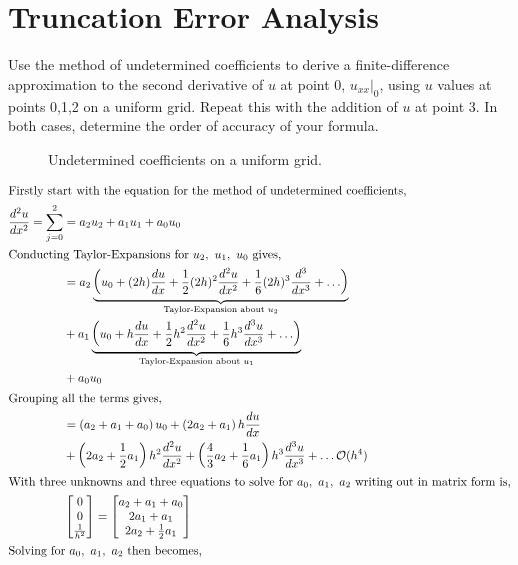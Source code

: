\pagebreak
\section{Truncation Error Analysis}
Use the method of undetermined coefficients to derive a finite-difference approximation to the second derivative of $u$ at point 0, $u_{xx}|_0$, using $u$ values at points 0,1,2 on a uniform grid.  Repeat this with the addition of $u$ at point 3.  In both cases, determine the order of accuracy of your formula.

    \begin{figure}[h]
        \centering
        
        \caption{Undetermined coefficients on a uniform grid.}
    \end{figure}

\vspace{-0.2in}
\begin{align*}
    \shortintertext{Firstly start with the equation for the method of undetermined coefficients,}
    \frac{d^2u}{dx^2} = \sum_{j=0}^{2} & = a_2u_2 + a_1u_1 + a_0u_0\\
    \shortintertext{Conducting Taylor-Expansions for $u_2,\ u_1,\ u_0$ gives,}
        & = a_2 \underbrace{\left(u_0 + (2h)\frac{du}{dx} + \frac{1}{2}(2h)^2\frac{d^2u}{dx^2} + \frac{1}{6}(2h)^3\frac{d^3}{dx^3} + \ldots \right)}_{\text{Taylor-Expansion about $u_2$}}\\
        & + a_1\underbrace{\left(u_0 + h\frac{du}{dx} + \frac{1}{2}h^2\frac{d^2u}{dx^2} + \frac{1}{6}h^3\frac{d^3u}{dx^3} + \ldots \right)}_{\text{Taylor-Expansion about $u_1$}}\\
        & + a_0u_0\\
    \shortintertext{Grouping all the terms gives,}
        & = \left(a_2 + a_1 + a_0\right)u_0 + \left(2a_2 + a_1\right)h\frac{du}{dx}\\
        & + \left(2a_2 + \frac{1}{2}a_1\right)h^2\frac{d^2u}{dx^2} + \left(\frac{4}{3}a_2 + \frac{1}{6}a_1\right)h^3\frac{d^3u}{dx^3} + \ldots \mathcal{O}(h^4)\\
    \shortintertext{With three unknowns and three equations to solve for $a_0,\ a_1,\ a_2$ writing out in matrix form is,}
     & \begin{bmatrix}
        0\\
        0\\
        \frac{1}{h^2}
    \end{bmatrix} = \begin{bmatrix}
        a_2 + a_1 + a_0\\
        2a_1 + a_1\\
        2a_2 + \frac{1}{2}a_1
    \end{bmatrix}\\
    \shortintertext{Solving for $a_0,\ a_1,\ a_2$ then becomes,}
\end{align*}

